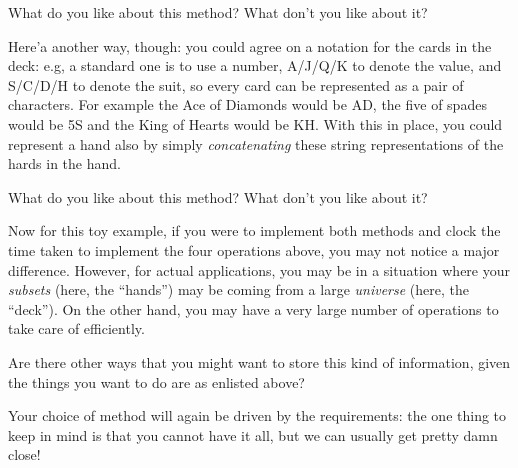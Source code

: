 \documentclass[
  letterpaper,
  DIV=11,
  numbers=noendperiod]{scrreprt}
\begin{document}
\begin{tcolorbox}[standard jigsaw,titlerule=0mm, leftrule=.75mm, colbacktitle=quarto-callout-caution-color!10!white, toptitle=1mm, toprule=.15mm, colframe=quarto-callout-caution-color-frame, colback=white, coltitle=black, title=\textcolor{quarto-callout-caution-color}{\faFire}\hspace{0.5em}{Food for thought.}, bottomrule=.15mm, rightrule=.15mm, bottomtitle=1mm, left=2mm, opacitybacktitle=0.6, arc=.35mm, opacityback=0]
What do you like about this method? What don't you like about it?
\end{tcolorbox}

Here'a another way, though: you could agree on a notation for the cards
in the deck: e.g, a standard one is to use a number, A/J/Q/K to denote
the value, and S/C/D/H to denote the suit, so every card can be
represented as a pair of characters. For example the Ace of Diamonds
would be AD, the five of spades would be 5S and the King of Hearts would
be KH. With this in place, you could represent a hand also by simply
\emph{concatenating} these string representations of the hards in the
hand.

\begin{tcolorbox}[standard jigsaw,titlerule=0mm, leftrule=.75mm, colbacktitle=quarto-callout-caution-color!10!white, toptitle=1mm, toprule=.15mm, colframe=quarto-callout-caution-color-frame, colback=white, coltitle=black, title=\textcolor{quarto-callout-caution-color}{\faFire}\hspace{0.5em}{Food for thought.}, bottomrule=.15mm, rightrule=.15mm, bottomtitle=1mm, left=2mm, opacitybacktitle=0.6, arc=.35mm, opacityback=0]
What do you like about this method? What don't you like about it?
\end{tcolorbox}

Now for this toy example, if you were to implement both methods and
clock the time taken to implement the four operations above, you may not
notice a major difference. However, for actual applications, you may be
in a situation where your \emph{subsets} (here, the ``hands'') may be
coming from a large \emph{universe} (here, the ``deck''). On the other
hand, you may have a very large number of operations to take care of
efficiently.

\begin{tcolorbox}[standard jigsaw,titlerule=0mm, leftrule=.75mm, colbacktitle=quarto-callout-caution-color!10!white, toptitle=1mm, toprule=.15mm, colframe=quarto-callout-caution-color-frame, colback=white, coltitle=black, title=\textcolor{quarto-callout-caution-color}{\faFire}\hspace{0.5em}{Food for thought.}, bottomrule=.15mm, rightrule=.15mm, bottomtitle=1mm, left=2mm, opacitybacktitle=0.6, arc=.35mm, opacityback=0]
Are there other ways that you might want to store this kind of
information, given the things you want to do are as enlisted above?
\end{tcolorbox}

Your choice of method will again be driven by the requirements: the one
thing to keep in mind is that you cannot have it all, but we can usually
get pretty damn close!

\hypertarget{hyvor-talk-view}{}
\end{document}

